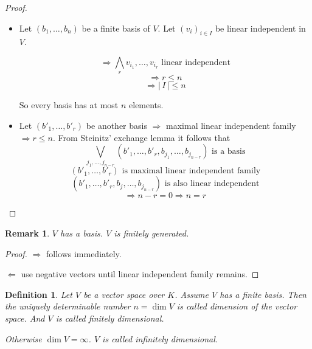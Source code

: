 \documentclass[a4paper,landscape,twocolumn]{article}
\newcommand\card[1]{\left|\,#1\,\right|}
\newtheorem{defi}{Definition}
\newtheorem{rem}{Remark}
\begin{document}
\begin{proof}
  \begin{itemize}
    \item
      Let $(b_1, \dots, b_n)$ be a finite basis of $V$.
      Let $(v_i)_{i \in I}$ be linear independent in $V$.

      \[ \Rightarrow \bigwedge_{r} v_{i_1}, \dots, v_{i_r} \text{ linear independent} \]
      \[ \Rightarrow r \leq n \]
      \[ \Rightarrow \card{I} \leq n \]

      So every basis has at most $n$ elements.

    \item
      Let $(b'_1, \dots, b'_r)$ be another basis $\Rightarrow$ maximal linear independent family $\Rightarrow r \leq n$.
      From Steinitz' exchange lemma it follows that
      \[ \bigvee_{j_1, \dots, j_{n-r}} (b'_1, \dots, b'_r, b_{j_1}, \dots, b_{j_{n-r}}) \text{ is a basis} \]
      \[ (b'_1, \dots, b'_r) \text{ is maximal linear independent family} \]
      \[ (b'_1, \dots, b'_r, b_j, \dots, b_{j_{n-r}}) \text{ is also linear independent} \]
      \[ \Rightarrow n - r = 0 \Rightarrow n = r \]
  \end{itemize}
\end{proof}

\begin{rem}
  \label{3-29}
  $V$ has a basis. $V$ is finitely generated.
\end{rem}

\begin{proof}
  $\Rightarrow$ follows immediately.

  $\Leftarrow$ use negative vectors until linear independent family remains.
\end{proof}

\begin{defi}
  Let $V$ be a vector space over $K$.
  Assume $V$ has a finite basis.
  Then the uniquely determinable number $n = \dim{V}$ is called dimension of the vector space.
  And $V$ is called \emph{finitely dimensional}.

  Otherwise $\dim{V} = \infty$. $V$ is called \emph{infinitely dimensional}.
\end{defi}
\end{document}
